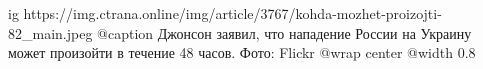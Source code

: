  
 
 
 
 

\ifcmt
  ig https://img.ctrana.online/img/article/3767/kohda-mozhet-proizojti-82_main.jpeg
  @caption Джонсон заявил, что нападение России на Украину может произойти в течение 48 часов. Фото: Flickr 
  @wrap center
  @width 0.8
\fi
